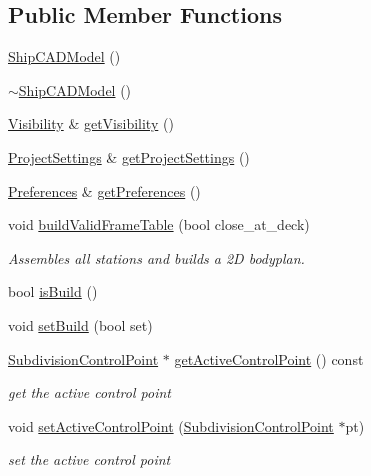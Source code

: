 \subsection*{Public Member Functions}
\begin{DoxyCompactItemize}
\item 
\hyperlink{classShipCAD_1_1ShipCADModel_abede72e53058c2ecf8dc2c4b2a7c8014}{Ship\-C\-A\-D\-Model} ()
\item 
\hyperlink{classShipCAD_1_1ShipCADModel_a69faa69f492a5aad941990319e5e88c0}{$\sim$\-Ship\-C\-A\-D\-Model} ()
\item 
\hyperlink{classShipCAD_1_1Visibility}{Visibility} \& \hyperlink{classShipCAD_1_1ShipCADModel_a50cca4c783baeba58c8068c9b8a5d6a4}{get\-Visibility} ()
\item 
\hyperlink{classShipCAD_1_1ProjectSettings}{Project\-Settings} \& \hyperlink{classShipCAD_1_1ShipCADModel_a94a8eed8ac8ff4ad8287a0a1113e3271}{get\-Project\-Settings} ()
\item 
\hyperlink{classShipCAD_1_1Preferences}{Preferences} \& \hyperlink{classShipCAD_1_1ShipCADModel_aa6af8872deba5b401ac575a85901a265}{get\-Preferences} ()
\item 
void \hyperlink{classShipCAD_1_1ShipCADModel_abefac47aa19318b4ae3c82108dfe4585}{build\-Valid\-Frame\-Table} (bool close\-\_\-at\-\_\-deck)
\begin{DoxyCompactList}\small\item\em Assembles all stations and builds a 2\-D bodyplan. \end{DoxyCompactList}\item 
bool \hyperlink{classShipCAD_1_1ShipCADModel_a0c7a15b80b5013066fd77f46e57850ef}{is\-Build} ()
\item 
void \hyperlink{classShipCAD_1_1ShipCADModel_ab221977f2a8bd4d51d6ee777be0d7b8a}{set\-Build} (bool set)
\item 
\hyperlink{classShipCAD_1_1SubdivisionControlPoint}{Subdivision\-Control\-Point} $\ast$ \hyperlink{classShipCAD_1_1ShipCADModel_afe13cf557e067ae883433aa6f5afaf6a}{get\-Active\-Control\-Point} () const 
\begin{DoxyCompactList}\small\item\em get the active control point \end{DoxyCompactList}\item 
void \hyperlink{classShipCAD_1_1ShipCADModel_a523a7e9948d95a71e9008d386daeafee}{set\-Active\-Control\-Point} (\hyperlink{classShipCAD_1_1SubdivisionControlPoint}{Subdivision\-Control\-Point} $\ast$pt)
\begin{DoxyCompactList}\small\item\em set the active control point \end{DoxyCompactList}\item 

\end{DoxyCompactItemize}
